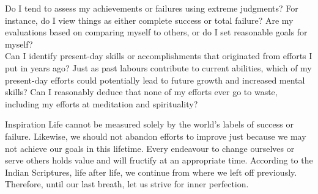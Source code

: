 



\newpage
\begin{mananam}{}
\mananamtext Do I tend to assess my achievements or failures using extreme judgments? For instance, do I view things as either complete success or total failure? Are my evaluations based on comparing myself to others, or do I set reasonable goals for myself?\\
Can I identify present-day skills or accomplishments that originated from efforts I put in years ago? Just as past labours contribute to current abilities, which of my present-day efforts could potentially lead to future growth and increased mental skills? Can I reasonably deduce that none of my efforts ever go to waste, including my efforts at meditation and spirituality?
\end{mananam}
\WritingHand{}
\begin{inspiration}{\mananamfont Inspiration}
\mananamtext Life cannot be measured solely by the world’s labels of success or failure. Likewise, we should not abandon efforts to improve just because we may not achieve our goals in this lifetime. Every endeavour to change ourselves or serve others holds value and will fructify at an appropriate time. According to the Indian Scriptures, life after life, we continue from where we left off previously. Therefore, until our last breath, let us strive for inner perfection.
\end{inspiration}
\newpage


